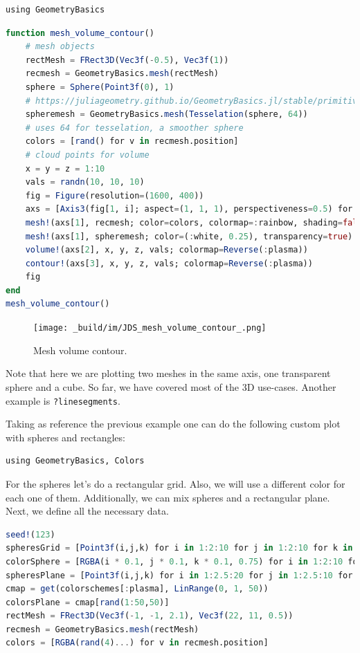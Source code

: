 \documentclass[
  notoc %
]{tufte-book}
\newcommand{\passthrough}[1]{#1}
\begin{document}
\begin{lstlisting}
using GeometryBasics
\end{lstlisting}

\begin{lstlisting}[language=Julia]
function mesh_volume_contour()
    # mesh objects
    rectMesh = FRect3D(Vec3f(-0.5), Vec3f(1))
    recmesh = GeometryBasics.mesh(rectMesh)
    sphere = Sphere(Point3f(0), 1)
    # https://juliageometry.github.io/GeometryBasics.jl/stable/primitives/
    spheremesh = GeometryBasics.mesh(Tesselation(sphere, 64))
    # uses 64 for tesselation, a smoother sphere
    colors = [rand() for v in recmesh.position]
    # cloud points for volume
    x = y = z = 1:10
    vals = randn(10, 10, 10)
    fig = Figure(resolution=(1600, 400))
    axs = [Axis3(fig[1, i]; aspect=(1, 1, 1), perspectiveness=0.5) for i = 1:3]
    mesh!(axs[1], recmesh; color=colors, colormap=:rainbow, shading=false)
    mesh!(axs[1], spheremesh; color=(:white, 0.25), transparency=true)
    volume!(axs[2], x, y, z, vals; colormap=Reverse(:plasma))
    contour!(axs[3], x, y, z, vals; colormap=Reverse(:plasma))
    fig
end
mesh_volume_contour()
\end{lstlisting}

\begin{figure}
\hypertarget{fig:mesh_volume_contour}{%
\centering
\texttt{[image: \_build/im/JDS\_mesh\_volume\_contour\_.png]}
\caption{Mesh volume contour.}\label{fig:mesh_volume_contour}
}
\end{figure}

Note that here we are plotting two meshes in the same axis, one
transparent sphere and a cube. So far, we have covered most of the 3D
use-cases. Another example is \passthrough{\lstinline!?linesegments!}.

Taking as reference the previous example one can do the following custom
plot with spheres and rectangles:

\begin{lstlisting}
using GeometryBasics, Colors
\end{lstlisting}

For the spheres let's do a rectangular grid. Also, we will use a
different color for each one of them. Additionally, we can mix spheres
and a rectangular plane. Next, we define all the necessary data.

\begin{lstlisting}[language=Julia]
seed!(123)
spheresGrid = [Point3f(i,j,k) for i in 1:2:10 for j in 1:2:10 for k in 1:2:10]
colorSphere = [RGBA(i * 0.1, j * 0.1, k * 0.1, 0.75) for i in 1:2:10 for j in 1:2:10 for k in 1:2:10]
spheresPlane = [Point3f(i,j,k) for i in 1:2.5:20 for j in 1:2.5:10 for k in 1:2.5:4]
cmap = get(colorschemes[:plasma], LinRange(0, 1, 50))
colorsPlane = cmap[rand(1:50,50)]
rectMesh = FRect3D(Vec3f(-1, -1, 2.1), Vec3f(22, 11, 0.5))
recmesh = GeometryBasics.mesh(rectMesh)
colors = [RGBA(rand(4)...) for v in recmesh.position]
\end{lstlisting}
\end{document}
